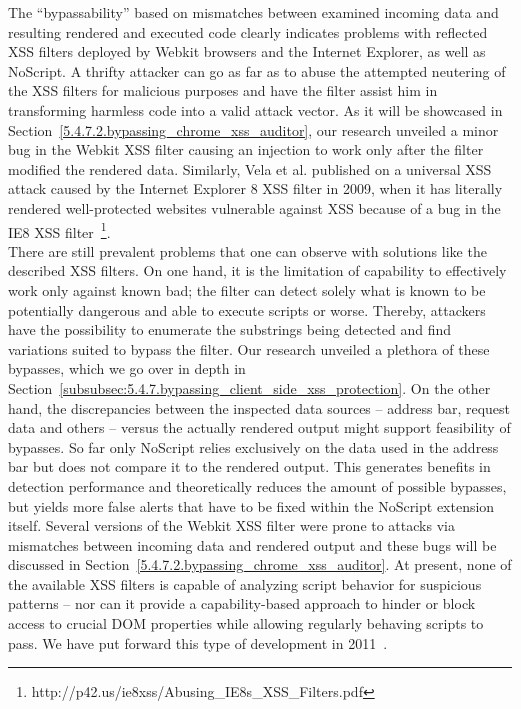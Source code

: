     The ``bypassability'' based on mismatches between examined incoming data and resulting rendered and executed code clearly indicates problems with reflected XSS filters deployed by Webkit browsers and the Internet Explorer, as well as NoScript. A thrifty attacker can go as far as to abuse the attempted neutering of the XSS filters for malicious purposes and have the filter assist him in transforming harmless code into a valid attack vector. As it will be showcased in Section~\ref{5.4.7.2.bypassing_chrome_xss_auditor}, our research unveiled a minor bug in the Webkit XSS filter causing an injection to work only after the filter modified the rendered data. Similarly, Vela et al. published on a universal XSS attack caused by the Internet Explorer 8 XSS filter in 2009, when it has literally rendered well-protected websites vulnerable against XSS because of a bug in the IE8 XSS filter~\footnote{http://p42.us/ie8xss/Abusing\_IE8s\_XSS\_Filters.pdf}.\\

    There are still prevalent problems that one can observe with solutions like the described XSS filters. On one hand, it is the limitation of capability to effectively work only against known bad; the filter can detect solely what is known to be potentially dangerous and able to execute scripts or worse. Thereby, attackers have the possibility to enumerate the substrings being detected and find variations suited to bypass the filter. Our research unveiled a plethora of these bypasses, which we go over in depth in Section~\ref{subsubsec:5.4.7.bypassing_client_side_xss_protection}. On the other hand, the discrepancies between the inspected data sources -- address bar, request data and others -- versus the actually rendered output might support feasibility of bypasses. So far only NoScript relies exclusively on the data used in the address bar but does not compare it to the rendered output. This generates benefits in detection performance and theoretically reduces the amount of possible bypasses, but yields 
more false alerts that have to be fixed within the NoScript extension itself. Several versions of the Webkit XSS filter were prone to attacks via mismatches between incoming data and rendered output and these bugs will be discussed in Section~\ref{5.4.7.2.bypassing_chrome_xss_auditor}. At present, none of the available XSS filters is capable of analyzing script behavior for suspicious patterns -- nor can it provide a capability-based approach to hinder or block access to crucial DOM properties while allowing regularly behaving scripts to pass. We have put forward this type of development in 2011~\cite{heiderich2011iceshield}.

